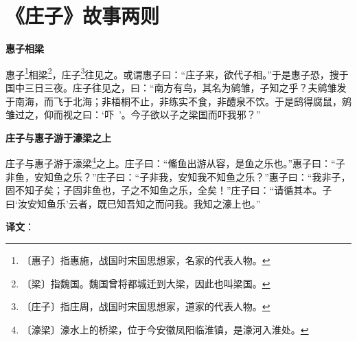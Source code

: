 \documentclass[12pt,UTF-8,openany,a4]{ctexbook}
\begin{document}
\chapter{《庄子》故事两则}

\begin{large}
    
    \begin{center}{\Large\textbf{惠子相梁}}\end{center}
    
    惠子\footnote{〔惠子〕\yiwen 指惠施，战国时宋国思想家，名家的代表人物。}相梁\footnote{〔梁〕\yiwen 指魏国。魏国曾将都城迁到大梁，因此也叫梁国。}，庄子\footnote{〔庄子〕\yiwen 指庄周，战国时宋国思想家，道家的代表人物。}往见之。或谓惠子曰：“庄子来，欲代子相。”于是惠子恐，搜于国中三日三夜。庄子往见之，曰：“南方有鸟，其名为鹓雏，子知之乎？夫鹓雏发于南海，而飞于北海；非梧桐不止，非练实不食，非醴泉不饮。于是鸱得腐鼠，鹓雏过之，仰而视之曰：‘吓~’。今子欲以子之梁国而吓我邪？”
    
    \begin{center}{\Large\textbf{庄子与惠子游于濠梁之上}}\end{center}
    
    庄子与惠子游于濠梁\footnote{〔濠梁〕\yiwen 濠水上的桥梁，位于今安徽凤阳临淮镇，是濠河入淮处。}之上。庄子曰：“鯈鱼出游从容，是鱼之乐也。”惠子曰：“子非鱼，安知鱼之乐？”庄子曰：“子非我，安知我不知鱼之乐？”惠子曰：“我非子，固不知子矣；子固非鱼也，子之不知鱼之乐，全矣！”庄子曰：“请循其本。子曰‘汝安知鱼乐’云者，既已知吾知之而问我。我知之濠上也。”

\end{large}


\newpage

\begin{Large}
   \noindent \textbf{译文}：
\end{Large}

\vspace{1em}
\end{document}
